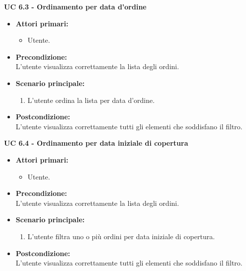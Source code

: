 \vspace{0.5cm}

\noindent \textbf{\large UC 6.3 - Ordinamento per data d'ordine }
\label{uc:ordinamento-data-ordine}
\begin{itemize}

	\item \textbf{Attori primari: }
		\begin{itemize}
			\item Utente.
		\end{itemize}

	\item \textbf{Precondizione: }\\[0.3cm]
		L'utente visualizza correttamente la lista degli ordini.

	\item \textbf{Scenario principale: }
		\begin{enumerate}
			\item L'utente ordina la lista per data d'ordine.
		\end{enumerate}
		

	\item \textbf{Postcondizione: }\\[0.3cm]
		L'utente visualizza correttamente tutti gli elementi che soddisfano il filtro.

\end{itemize}

\vspace{0.5cm}

\noindent \textbf{\large UC 6.4 - Ordinamento per data iniziale di copertura }
\label{uc:ordinamento-data-iniziale-copertura}
\begin{itemize}

	\item \textbf{Attori primari: }
		\begin{itemize}
			\item Utente.
		\end{itemize}

	\item \textbf{Precondizione: }\\[0.3cm]
		L'utente visualizza correttamente la lista degli ordini.

	\item \textbf{Scenario principale: }
		\begin{enumerate}
			\item L'utente filtra uno o più ordini per data iniziale di copertura.
		\end{enumerate}
		

	\item \textbf{Postcondizione: }\\[0.3cm]
		L'utente visualizza correttamente tutti gli elementi che soddisfano il filtro.

\end{itemize}

